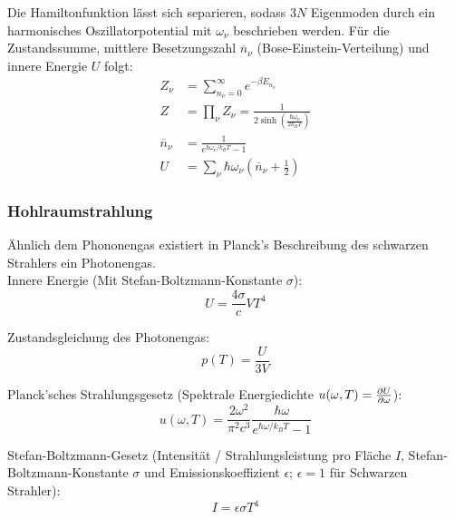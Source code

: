 \documentclass[11pt]{article}
\numberwithin{equation}{section}
\begin{document}
        Die Hamiltonfunktion lässt sich separieren, sodass $3N$ Eigenmoden durch ein harmonisches Oszillatorpotential mit $\omega_\nu$ beschrieben werden. Für die Zustandssumme, mittlere Besetzungszahl $\overline{n}_\nu$ (Bose-Einstein-Verteilung) und innere Energie $U$ folgt:
        \begin{equation}
          \begin{aligned}
            Z_\nu &= \sum_{n_\nu=0}^\infty e^{-\beta E_{n_\nu}} \\
            Z &= \prod_\nu Z_\nu = \frac{1}{2\sinh{\left( \frac{\hbar\omega_\nu}{2 k_B T} \right)}} \\
            \overline{n}_\nu &= \frac{1}{e^{\hbar\omega_\nu/k_B T} - 1} \\
            U &= \sum_\nu \hbar\omega_\nu \left(\overline{n}_\nu + \frac{1}{2}\right)
          \end{aligned}
        \end{equation}

      \subsubsection{Hohlraumstrahlung}
        Ähnlich dem Phononengas existiert in Planck's Beschreibung des schwarzen Strahlers ein Photonengas. \\

        Innere Energie (Mit Stefan-Boltzmann-Konstante $\sigma$):
        \begin{equation}
          U = \frac{4\sigma}{c} V T^4
        \end{equation}

        Zustandsgleichung des Photonengas:
        \begin{equation}
          p(T) = \frac{U}{3V}
        \end{equation}

        Planck'sches Strahlungsgesetz (Spektrale Energiedichte $u(\omega,T) = \frac{\partial U}{\partial \omega}$):
        \begin{equation}
          u(\omega,T) = \frac{2 \omega^2}{\pi^2 c^3} \frac{\hbar \omega}{e^{\hbar \omega / k_B T} - 1}
        \end{equation}

        Stefan-Boltzmann-Gesetz (Intensität / Strahlungsleistung pro Fläche $I$, Stefan-Boltzmann-Konstante $\sigma$ und Emissionskoeffizient $\epsilon$; $\epsilon=1$ für Schwarzen Strahler):
        \begin{equation}
          I = \epsilon\sigma T^4
        \end{equation}
\end{document}
